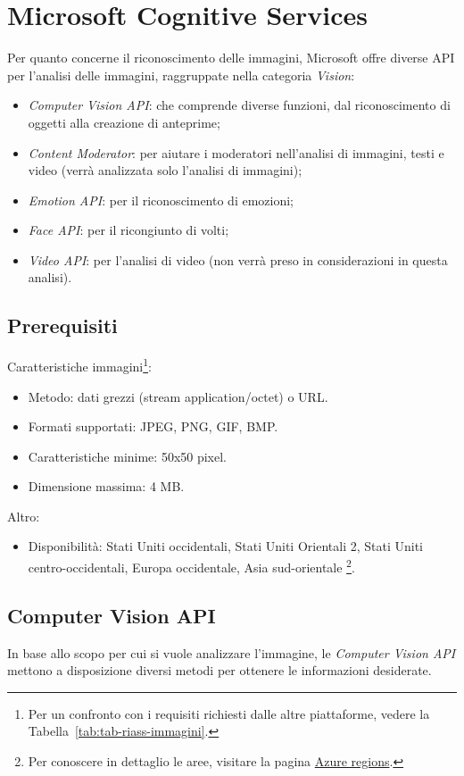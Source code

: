 
\section{Microsoft Cognitive Services}
Per quanto concerne il riconoscimento delle immagini, Microsoft offre diverse API per l'analisi delle immagini, raggruppate nella categoria \textit{Vision}:
\begin{itemize}
\item \textit{Computer Vision API}: che comprende diverse funzioni, dal riconoscimento di oggetti alla creazione di anteprime;
\item \textit{Content Moderator}: per aiutare i moderatori nell'analisi di immagini, testi e video (verrà analizzata solo l'analisi di immagini);
\item \textit{Emotion API}: per il riconoscimento di emozioni;
\item \textit{Face API}: per il ricongiunto di volti;
\item \textit{Video API}: per l'analisi di video (non verrà preso in considerazioni in questa analisi).
\end{itemize}
%
\subsection{Prerequisiti}
Caratteristiche immagini\footnote{Per un confronto con i requisiti richiesti dalle altre piattaforme,
vedere la Tabella~\ref{tab:tab-riass-immagini}.}:
\begin{itemize}
\item Metodo: dati grezzi (stream application/octet) o URL.
\item Formati supportati: JPEG, PNG, GIF, BMP.
\item Caratteristiche minime: 50x50 pixel.
\item Dimensione massima: 4 MB.
\end{itemize}
Altro:
\begin{itemize}
\item Disponibilità: Stati Uniti occidentali, Stati Uniti Orientali 2, Stati Uniti centro-occidentali, Europa occidentale, Asia sud-orientale
\footnote{Per conoscere in dettaglio le aree, visitare la pagina \href{https://azure.microsoft.com/en-us/regions/}{Azure regions}.}.
\end{itemize}
%
\subsection{Computer Vision API}\label{subsec:computer-vision-api}
In base allo scopo per cui si vuole analizzare l'immagine, le \textit{Computer Vision API} \cite{microsoft-api} mettono a disposizione diversi metodi per ottenere le informazioni desiderate.

